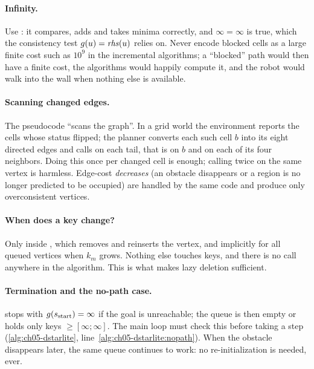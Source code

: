 \paragraph{Infinity.}
Use : it compares, adds and takes minima correctly, and
$\infty = \infty$ is true, which the consistency test $g(u) = \mathit{rhs}(u)$ relies on.
Never encode blocked cells as a large finite cost such as $10^9$ in the incremental
algorithms; a ``blocked'' path would then have a finite cost, the algorithms would
happily compute it, and the robot would walk into the wall when nothing else is
available.

\paragraph{Scanning changed edges.}
The pseudocode ``scans the graph''. In a grid world the environment reports the cells
whose status flipped; the planner converts each such cell $b$ into its eight directed
edges and calls \DslUpdateVertex on each tail, that is on $b$ and on each of its four
neighbors. Doing this once per changed cell is enough; calling \DslUpdateVertex twice
on the same vertex is harmless. Edge-cost \emph{decreases} (an obstacle disappears or a
region is no longer predicted to be occupied) are handled by the same code and produce
only overconsistent vertices.

\paragraph{When does a key change?}
Only inside \DslUpdateVertex, which removes and reinserts the vertex, and implicitly for
all queued vertices when $k_m$ grows. Nothing else touches keys, and there is no
 call anywhere in the algorithm. This is what makes lazy deletion
sufficient.

\paragraph{Termination and the no-path case.}
\DslComputeShortestPath stops with $g(s_{\mathrm{start}})=\infty$ if the goal is
unreachable; the queue is then empty or holds only keys $\ge [\infty;\infty]$. The main
loop must check this before taking a step (\cref{alg:ch05-dstarlite},
line~\ref{alg:ch05-dstarlite:nopath}). When the obstacle disappears later, the same
queue continues to work: no re-initialization is needed, ever.

